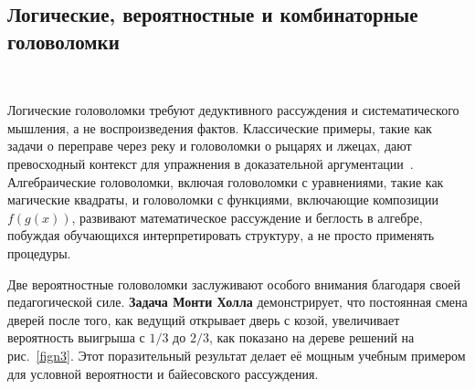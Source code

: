 \documentclass[a4paper,14pt]{extreport}
\theoremstyle{plain}
\theoremstyle{definition}
\theoremstyle{remark}
\begin{document}
\subsection{Логические, вероятностные и комбинаторные головоломки}~\label{sec4.1.4}

Логические головоломки требуют дедуктивного рассуждения и систематического мышления, а не воспроизведения фактов. Классические примеры, такие как задачи о переправе через реку и головоломки о рыцарях и лжецах, дают превосходный контекст для упражнения в доказательной аргументации~\cite{Rakshit}. Алгебраические головоломки, включая головоломки с уравнениями, такие как магические квадраты, и головоломки с функциями, включающие композиции $f(g(x))$, развивают математическое рассуждение и беглость в алгебре, побуждая обучающихся интерпретировать структуру, а не просто применять процедуры.

Две вероятностные головоломки заслуживают особого внимания благодаря своей педагогической силе. \textbf{Задача Монти Холла} демонстрирует, что постоянная смена дверей после того, как ведущий открывает дверь с козой, увеличивает вероятность выигрыша с $1/3$ до $2/3$, как показано на дереве решений на рис.~\ref{fign3}. Этот поразительный результат делает её мощным учебным примером для условной вероятности и байесовского рассуждения.
\end{document}

